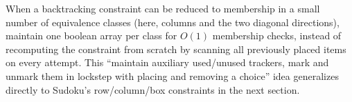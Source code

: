 \begin{takeawaybox}
When a backtracking constraint can be reduced to membership in a small
number of equivalence classes (here, columns and the two diagonal
directions), maintain one boolean array per class for $O(1)$
membership checks, instead of recomputing the constraint from scratch
by scanning all previously placed items on every attempt. This
``maintain auxiliary used/unused trackers, mark and unmark them in
lockstep with placing and removing a choice'' idea generalizes directly
to Sudoku's row/column/box constraints in the next section.
\end{takeawaybox}
